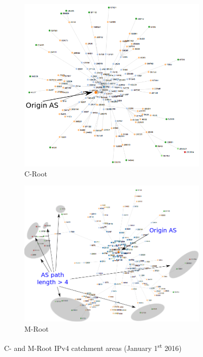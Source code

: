 \begin{figure}[!ht]
	\centering
	\begin{subfigure}{0.7\textwidth}
		\centering
		\includegraphics[width=1\linewidth]{img/catchment_c}
		\caption{C-Root}
		\label{fig:ch04:catchment_c}
	\end{subfigure}
	
	\begin{subfigure}{0.7\textwidth}
		\centering
		\includegraphics[width=1\linewidth]{img/catchment_m}
		\caption{M-Root}
		\label{fig:ch04:catchment_m}
	\end{subfigure}	
	\caption{C- and M-Root IPv4 catchment areas (January 1\textsuperscript{st} 2016)}
	\label{fig:ch04:catchment}
\end{figure}

